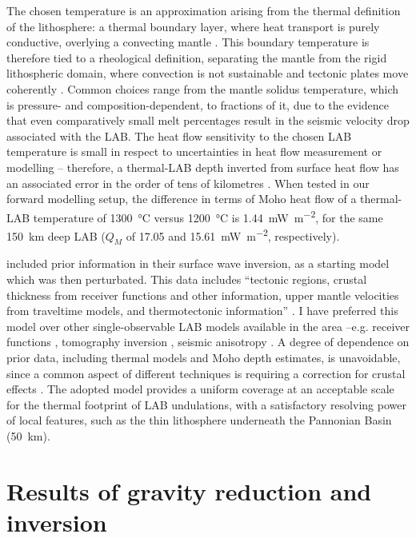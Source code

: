 The chosen temperature is an approximation arising from the thermal definition of the lithosphere: a thermal boundary layer, where heat transport is purely conductive, overlying a convecting mantle \parencites{Eaton2009}{fischer2010lab}.
This boundary temperature is therefore tied to a rheological definition, separating the mantle from the rigid lithospheric domain, where convection is not sustainable and tectonic plates move coherently \parencite{Steinberger2016}.
Common choices range from the mantle solidus temperature, which is pressure- and composition-dependent, to fractions of it, due to the evidence that even comparatively small melt percentages result in the seismic velocity drop associated with the LAB.
The heat flow sensitivity to the chosen LAB temperature is small in respect to uncertainties in heat flow measurement or modelling -- therefore, a thermal-LAB depth inverted from surface heat flow has an associated error in the order of tens of kilometres \parencite{Afonso2013multiobsI}.
When tested in our forward modelling setup, the difference in terms of Moho heat flow of a thermal-LAB temperature of \SI{1300}{\celsius} versus \SI{1200}{\celsius} is 1.44~\si{\milli \watt \per \square \metre}, for the same 150~\si{\kilo \metre} deep LAB ($Q_M$ of 17.05 and 15.61~\si{\milli \watt \per \square \metre}, respectively).

\textcite{Pasyanos2014} included prior information in their surface wave inversion, as a starting model which was then perturbated.
This data includes ``tectonic regions, crustal thickness from receiver functions and other information, upper mantle velocities from traveltime models, and thermotectonic information'' \parencite[p. 2154, ][]{Pasyanos2014}.
I have preferred this model over other single-observable LAB models available in the area --e.g. receiver functions \parencite{Geissler2010}, tomography inversion \parencite{Tesauro2009}, seismic anisotropy \parencite{Plomerova2010}.
A degree of dependence on prior data, including thermal models and Moho depth estimates, is unavoidable, since a common aspect of different techniques is requiring a correction for crustal effects \parencite{Jones2010}.
The adopted model provides a uniform coverage at an acceptable scale for the thermal footprint of LAB undulations, with a satisfactory resolving power of local features, such as the thin lithosphere underneath the Pannonian Basin (\SI{50}{\kilo \metre}).

\section{Results of gravity reduction and inversion}
\label{s:Appl:DiscGrav}

